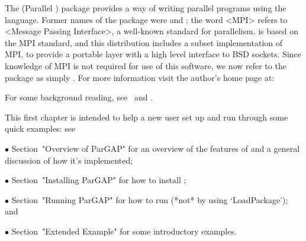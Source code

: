 
\hfuzz=5pt %
\overfullrule=0pt %


The {\ParGAP}  (Parallel  {\GAP})  package  provides  a  way  of  writing
parallel programs using the {\GAP} language. Former names of the  package
were  and ; the word <MPI> refers to
<Message Passing  Interface>,  a  well-known  standard  for  parallelism.
{\ParGAP} is based on the MPI standard, and this distribution includes  a
subset implementation of MPI, to provide a portable  layer  with  a  high
level interface to BSD sockets. Since knowledge of MPI  is  not  required
for use of  this  software,  we  now  refer  to  the  package  as  simply
{\ParGAP}. For more information visit the author's  {\ParGAP}  home  page
at:

For some background reading, see~\cite{Coo95} and \cite{Coo97}.

This first chapter is intended to help a new user set  up  {\ParGAP}  and
run through some quick examples: see

\beginlist%

\item{$\bullet$}
Section~"Overview of ParGAP" for an overview of the features of {\ParGAP}
and a general discussion of how it's implemented;

\item{$\bullet$}
Section~"Installing ParGAP" for how to install {\ParGAP};

\item{$\bullet$}
Section~"Running ParGAP"  for  how  to  run  {\ParGAP}  (*not*  by  using
`LoadPackage'); and

\item{$\bullet$}
Section~"Extended Example"  for  some introductory {\ParGAP} examples.

